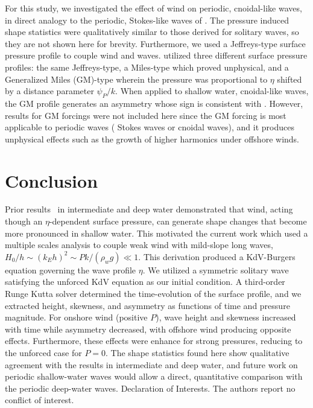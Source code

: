 \documentclass{jfm}
\begin{document}
For this study, we investigated the effect of wind on periodic,
cnoidal-like waves, in direct analogy to the periodic, Stokes-like waves
of \citet{zdyrski2020wind}.
The pressure induced shape statistics were qualitatively similar to
those derived for solitary waves, so they are not shown here for
brevity.
Furthermore, we used a Jeffreys-type surface pressure profile to
couple wind and waves.
 utilized three different surface pressure
profiles: the same Jeffreys-type, a Miles-type which proved unphysical,
and a Generalized Miles (GM)-type wherein the pressure was proportional to
$\eta$ shifted by a distance parameter $\psi_P/k$.
When applied to shallow water, cnoidal-like waves, the GM profile
generates an asymmetry whose sign is consistent with
\citet{zdyrski2020wind}.
However, results for GM forcings were not included here since the GM
forcing is most applicable to periodic waves (\eg{} Stokes waves or
cnoidal waves), and it produces unphysical effects such as the growth of
higher harmonics under offshore winds.

\section{Conclusion}
Prior results~\citep{zdyrski2020wind} in intermediate and deep water
demonstrated that wind, acting though an $\eta$-dependent surface
pressure, can generate shape changes that become more pronounced in
shallow water.
This motivated the current work which used a multiple scales analysis to
couple weak wind with mild-slope long waves, \ie{} $H_0/h \sim (k_E h)^2
\sim P k/(\rho_w g) \ll 1$.
This derivation produced a KdV-Burgers equation governing the wave
profile $\eta$.
We utilized a symmetric solitary wave satisfying the unforced KdV
equation as our initial condition.
A third-order Runge Kutta solver determined the time-evolution of the
surface profile, and we extracted height, skewness, and asymmetry as
functions of time and pressure magnitude.
For onshore wind (positive $P$), wave height and skewness increased with
time while asymmetry decreased, with offshore wind producing opposite
effects.
Furthermore, these effects were enhance for strong pressures, reducing
to the unforced case for $P=0$.
The shape statistics found here show qualitative agreement with the
results in intermediate and deep water, and future work on periodic
shallow-water waves would allow a direct, quantitative comparison with
the periodic deep-water waves.
Declaration of Interests. The authors report no conflict of interest.

\appendix



\end{document}
